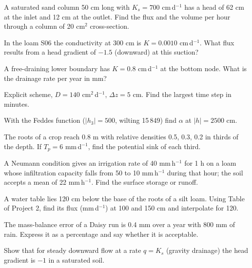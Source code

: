 \begin{exlist}
\item A saturated sand column 50 cm long with $K_s=700$ cm\,d$^{-1}$ has a head of 62 cm at the inlet and 12 cm at the outlet. Find the flux and the volume per hour through a column of 20 cm$^2$ cross-section.
\item In the loam S06 the conductivity at 300 cm is $K=0.0010$ cm\,d$^{-1}$. What flux results from a head gradient of $-1.5$ (downward) at this suction?
\item A free-draining lower boundary has $K=0.8$ cm\,d$^{-1}$ at the bottom node. What is the drainage rate per year in mm?\exans{2920 mm}
\item Explicit scheme, $D=140$ cm$^2$\,d$^{-1}$, $\Delta z=5$ cm. Find the largest time step in minutes.
\item With the Feddes function ($|h_3|=500$, wilting 15\,849) find $\alpha$ at $|h|=2500$ cm.
\item The roots of a crop reach 0.8 m with relative densities 0.5, 0.3, 0.2 in thirds of the depth. If $T_p=6$ mm\,d$^{-1}$, find the potential sink of each third.
\item A Neumann condition gives an irrigation rate of 40 mm\,h$^{-1}$ for 1 h on a loam whose infiltration capacity falls from 50 to 10 mm\,h$^{-1}$ during that hour; the soil accepts a mean of 22 mm\,h$^{-1}$. Find the surface storage or runoff.\exans{18 mm}
\item A water table lies 120 cm below the base of the roots of a silt loam. Using Table of Project 2, find its flux (mm\,d$^{-1}$) at 100 and 150 cm and interpolate for 120.
\item The mass-balance error of a Daisy run is 0.4 mm over a year with 800 mm of rain. Express it as a percentage and say whether it is acceptable.
\item Show that for steady downward flow at a rate $q=K_s$ (gravity drainage) the head gradient is $-1$ in a saturated soil.
\end{exlist}
